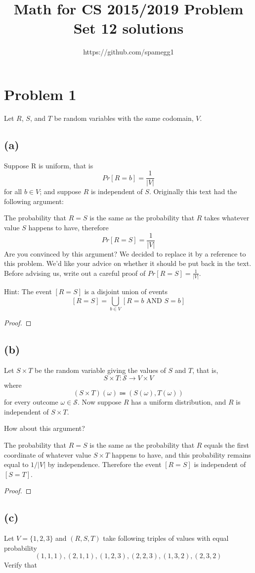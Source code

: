 \documentclass[14pt]{extarticle}
\title{Math for CS 2015/2019 Problem Set 12 solutions}
\author{https://github.com/spamegg1}
\begin{document}
\maketitle
\tableofcontents

\section{Problem 1}
Let $R$, $S$, and $T$ be random variables with the same codomain, $V$.
\subsection{(a)}
Suppose R is uniform, that is
$$
Pr[R = b] = \frac{1}{|V|}
$$
for all $b \in V$; and suppose $R$ is independent of $S$. Originally this text had the following argument:

The probability that $R = S$ is the same as the probability that $R$ takes whatever value $S$ happens to have, therefore
$$
Pr[R = S] = \frac{1}{|V|}
$$
Are you convinced by this argument? We decided to replace it by a reference to this problem. We’d like your advice on whether it should be put back in the text. Before advising us, write out a careful proof of $Pr[R = S] = \frac{1}{|V|}$.

Hint: The event $[R = S]$ is a disjoint union of events
$$
[R = S] = \bigcup_{b \in V}[R = b \text{ AND } S = b]
$$
\begin{proof}
\end{proof}

\subsection{(b)}
Let $S \times T$ be the random variable giving the values of $S$ and $T$, that is, 
$$
S \times T : \mathcal{S} \to V \times V
$$ 
where 
$$
(S \times T)(\omega)  \Coloneqq (S(\omega), T(\omega))
$$ 
for every outcome $\omega \in \mathcal{S}$. Now suppose $R$ has a uniform distribution, and $R$ is independent of $S \times T$. 

How about this argument?

The probability that $R = S$ is the same as the probability that $R$ equals the first coordinate of whatever value $S \times T$ happens to have, and this probability remains equal to $1/|V|$ by indepen­dence. Therefore the event $[R = S]$ is independent of $[S = T]$.
\begin{proof}
\end{proof}

\subsection{(c)}
Let $V = \{1, 2, 3\}$ and $(R, S, T)$ take following triples of values with equal probability
$$
(1, 1, 1), (2, 1, 1), (1, 2, 3), (2, 2, 3), (1, 3, 2), (2, 3, 2)
$$
Verify that
\end{document}
